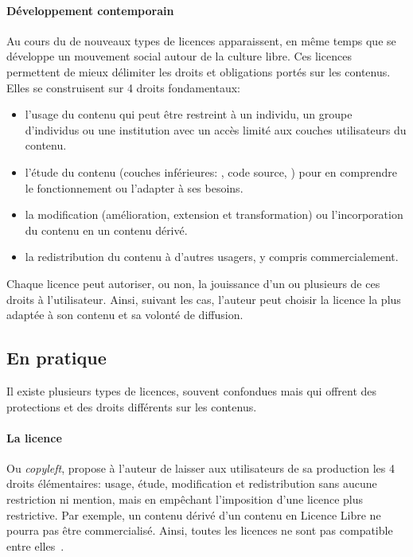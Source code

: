         \paragraph{Développement contemporain}
                Au cours du  de nouveaux types de licences apparaissent, en même temps que se développe un mouvement social autour de la culture libre. Ces licences permettent de mieux délimiter les droits et obligations portés sur les contenus. Elles se construisent sur 4 droits fondamentaux: 
                \begin{itemize}\myItemStyle
                    \item l'usage du contenu qui peut être restreint à un individu, un groupe d'individus ou une institution avec un accès limité aux couches utilisateurs du contenu.
                    \item l'étude du contenu (couches inférieures: , code source, \etc) pour en comprendre le fonctionnement ou l'adapter à ses besoins.
                    \item la modification (amélioration, extension et transformation) ou l'incorporation du contenu en un contenu dérivé.
                    \item la redistribution du contenu à d'autres usagers, y compris commercialement. 
                \end{itemize}
                Chaque licence peut autoriser, ou non, la jouissance d'un ou plusieurs de ces droits à l'utilisateur. Ainsi, suivant les cas, l'auteur peut choisir la licence la plus adaptée à son contenu et sa volonté de diffusion.
    \subsection{En pratique}
        Il existe plusieurs types de licences, souvent confondues mais qui offrent des protections et des droits différents sur les contenus.
        \paragraph{La licence }
            Ou \textit{copyleft}, propose à l'auteur de laisser aux utilisateurs de sa production les 4 droits élémentaires: usage, étude, modification et redistribution sans aucune restriction ni mention, mais en empêchant l'imposition d'une licence plus restrictive. Par exemple, un contenu dérivé d'un contenu en Licence Libre ne pourra pas être commercialisé. Ainsi, toutes les licences ne sont pas compatible entre elles~.
